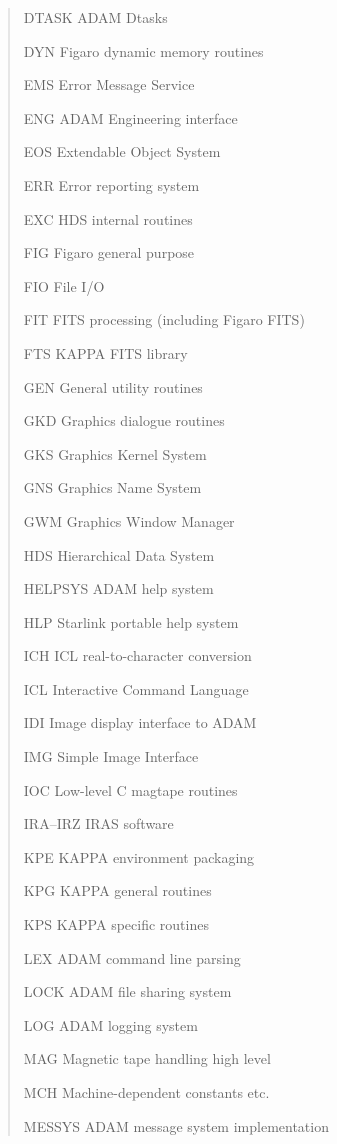 \documentclass[twoside,11pt,nolof,noabs]{starlink}
\renewcommand{\_}{{\tt\char'137}}
\begin{document}
\begin{quote}
\begin{aligndesc}
\item[DTASK] ADAM Dtasks
\item[DYN] Figaro dynamic memory routines
\item[EMS] Error Message Service
\item[ENG] ADAM Engineering interface
\item[EOS] Extendable Object System
\item[ERR] Error reporting system
\item[EXC] HDS internal routines
\item[FIG] Figaro general purpose
\item[FIO] File I/O
\item[FIT] FITS processing (including Figaro FITS)
\item[FTS] KAPPA FITS library
\item[GEN] General utility routines
\item[GKD] Graphics dialogue routines
\item[GKS] Graphics Kernel System
\item[GNS] Graphics Name System
\item[GWM] Graphics Window Manager
\item[HDS] Hierarchical Data System
\item[HELPSYS] ADAM help system
\item[HLP] Starlink portable help system
\item[ICH] ICL real-to-character conversion
\item[ICL] Interactive Command Language
\item[IDI] Image display interface to ADAM
\item[IMG] Simple Image Interface
\item[IOC] Low-level C magtape routines
\item[IRA--IRZ] IRAS software
\item[KPE] KAPPA environment packaging
\item[KPG] KAPPA general routines
\item[KPS] KAPPA specific routines
\item[LEX] ADAM command line parsing
\item[LOCK] ADAM file sharing system
\item[LOG] ADAM logging system
\item[MAG] Magnetic tape handling high level
\item[MCH] Machine-dependent constants etc.
\item[MESSYS] ADAM message system implementation

\end{aligndesc}
\end{quote}
\end{document}
